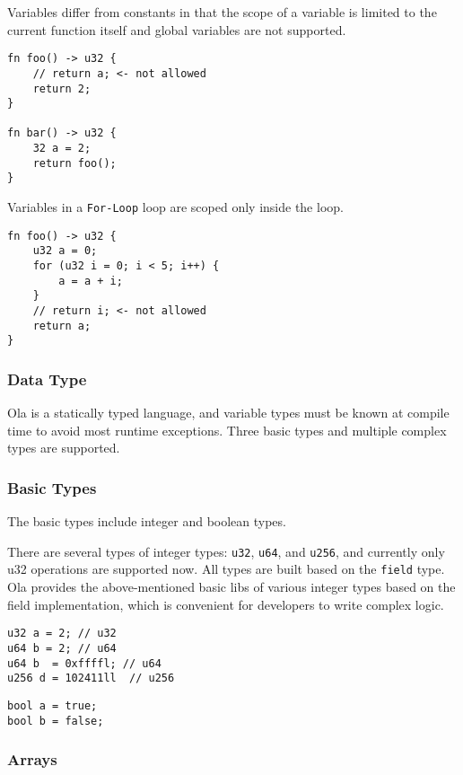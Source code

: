 Variables differ from constants in that the scope of a variable is limited to the current function itself and global variables are not supported.

\begin{lstlisting}
fn foo() -> u32 {
    // return a; <- not allowed
    return 2;
}

fn bar() -> u32 {
    32 a = 2;
    return foo();
}
\end{lstlisting}

Variables in a \texttt{For-Loop} loop are scoped only inside the loop.

\begin{lstlisting}
fn foo() -> u32 {
    u32 a = 0;
    for (u32 i = 0; i < 5; i++) {
        a = a + i;
    }
    // return i; <- not allowed
    return a;
}
\end{lstlisting}

\subsubsection{Data Type}

Ola is a statically typed language, and variable types must be known at compile time to avoid most runtime exceptions. 
Three basic types and multiple complex types are supported.

\subsubsection*{Basic Types}

The basic types include integer and boolean types.

There are several types of integer types: \texttt{u32}, \texttt{u64}, and \texttt{u256}, and currently only u32 operations are supported now. 
All types are built based on the \texttt{field} type.
Ola provides the above-mentioned basic libs of various integer types based on the field implementation, which is convenient for developers to write complex logic.

\begin{lstlisting}
u32 a = 2; // u32
u64 b = 2; // u64
u64 b  = 0xffffl; // u64
u256 d = 102411ll  // u256
\end{lstlisting}

\begin{lstlisting}
bool a = true;
bool b = false;
\end{lstlisting}
\subsubsection*{Arrays}

